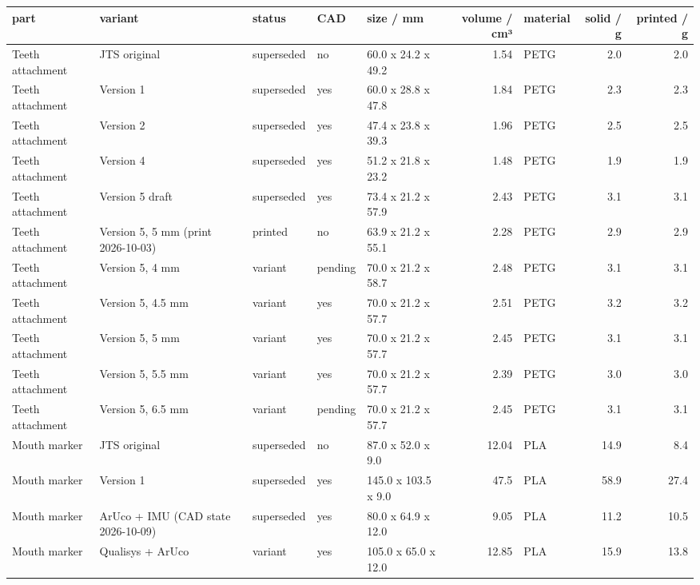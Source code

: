 
\begin{tabular}{lllllrlrr}
\toprule
part & variant & status & CAD & size / mm & volume / cm³ & material & solid / g & printed / g \\
\midrule
Teeth attachment & JTS original & superseded & no & 60.0 x 24.2 x 49.2 & 1.54 & PETG & 2.0 & 2.0 \\
Teeth attachment & Version 1 & superseded & yes & 60.0 x 28.8 x 47.8 & 1.84 & PETG & 2.3 & 2.3 \\
Teeth attachment & Version 2 & superseded & yes & 47.4 x 23.8 x 39.3 & 1.96 & PETG & 2.5 & 2.5 \\
Teeth attachment & Version 4 & superseded & yes & 51.2 x 21.8 x 23.2 & 1.48 & PETG & 1.9 & 1.9 \\
Teeth attachment & Version 5 draft & superseded & yes & 73.4 x 21.2 x 57.9 & 2.43 & PETG & 3.1 & 3.1 \\
Teeth attachment & Version 5, 5 mm (print 2026-10-03) & printed & no & 63.9 x 21.2 x 55.1 & 2.28 & PETG & 2.9 & 2.9 \\
Teeth attachment & Version 5, 4 mm & variant & pending & 70.0 x 21.2 x 58.7 & 2.48 & PETG & 3.1 & 3.1 \\
Teeth attachment & Version 5, 4.5 mm & variant & yes & 70.0 x 21.2 x 57.7 & 2.51 & PETG & 3.2 & 3.2 \\
Teeth attachment & Version 5, 5 mm & variant & yes & 70.0 x 21.2 x 57.7 & 2.45 & PETG & 3.1 & 3.1 \\
Teeth attachment & Version 5, 5.5 mm & variant & yes & 70.0 x 21.2 x 57.7 & 2.39 & PETG & 3.0 & 3.0 \\
Teeth attachment & Version 5, 6.5 mm & variant & pending & 70.0 x 21.2 x 57.7 & 2.45 & PETG & 3.1 & 3.1 \\
Mouth marker & JTS original & superseded & no & 87.0 x 52.0 x 9.0 & 12.04 & PLA & 14.9 & 8.4 \\
Mouth marker & Version 1 & superseded & yes & 145.0 x 103.5 x 9.0 & 47.5 & PLA & 58.9 & 27.4 \\
Mouth marker & ArUco + IMU (CAD state 2026-10-09) & superseded & yes & 80.0 x 64.9 x 12.0 & 9.05 & PLA & 11.2 & 10.5 \\
Mouth marker & Qualisys + ArUco & variant & yes & 105.0 x 65.0 x 12.0 & 12.85 & PLA & 15.9 & 13.8 \\

\end{tabular}
